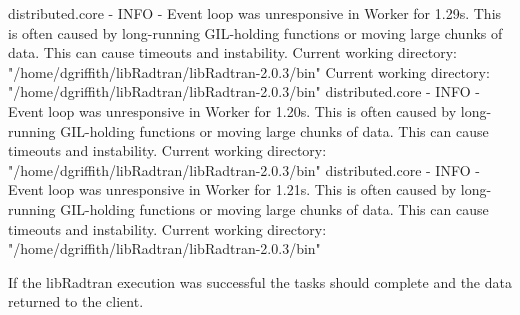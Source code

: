        distributed.core - INFO - Event loop was unresponsive in Worker for 1.29s.  This is often caused by long-running GIL-holding functions or moving large chunks of data. This can cause timeouts and instability.
        Current working directory: "/home/dgriffith/libRadtran/libRadtran-2.0.3/bin"
        Current working directory: "/home/dgriffith/libRadtran/libRadtran-2.0.3/bin"
        distributed.core - INFO - Event loop was unresponsive in Worker for 1.20s.  This is often caused by long-running GIL-holding functions or moving large chunks of data. This can cause timeouts and instability.
        Current working directory: "/home/dgriffith/libRadtran/libRadtran-2.0.3/bin"
        distributed.core - INFO - Event loop was unresponsive in Worker for 1.21s.  This is often caused by long-running GIL-holding functions or moving large chunks of data. This can cause timeouts and instability.
        Current working directory: "/home/dgriffith/libRadtran/libRadtran-2.0.3/bin"


        
If the libRadtran execution was successful the tasks should complete and the data returned to the client.


